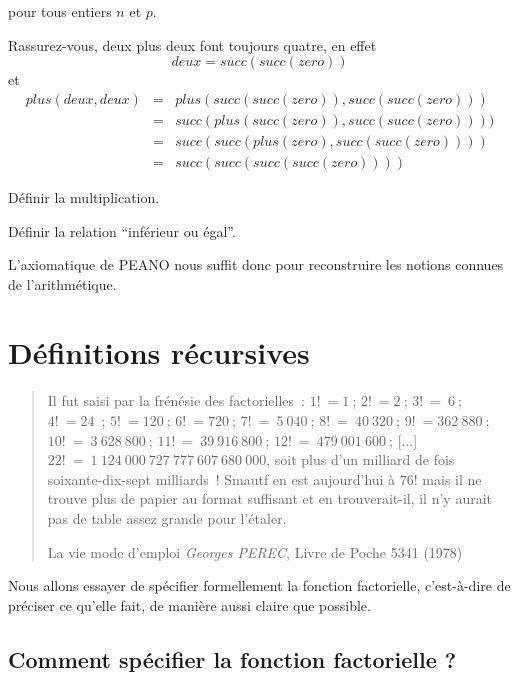 		pour tous entiers $n$ et $p$.

Rassurez-vous, deux plus deux font toujours quatre, en effet 
$$deux = succ(succ(zero))$$
et
$$\begin{array}{rcl}
	plus(deux, deux) 	&=& plus ( succ(succ(zero)),  succ(succ(zero)) ) \\
				&=& succ ( plus ( succ(zero)),  succ(succ(zero)) )) \\
				&=& succ (succ ( plus (zero),  succ(succ(zero)) )) \\
				&=& succ ( succ (succ ( succ ( zero ) ) ) )
\end{array}$$



\begin{exercice} Définir la multiplication.
\end{exercice}

\begin{exercice} Définir la relation ``inférieur ou égal''.
\end{exercice}

L'axiomatique de PEANO nous suffit donc pour reconstruire les notions
connues de l'arithmétique.


\section{Définitions récursives}

\begin{quotation}
Il fut saisi par la frénésie des factorielles~: $1!~= 1~$; $2!~= 2~$; 
$3!~=~6~$; $4!~= 24$~; $5!~= 120~$; $6!~= 720~$; $7!~=~5~040~$; $8!~=~40~320~$; 
$9!~=362~880~$; $10!~=~3~628~800~$; $11!~=~39~916~800~$; $12!~=~479~001~600~$; [...]
$22!~=~1~124~000~727~777~607~680~000$, soit plus d'un milliard de fois
soixante-dix-sept milliards~!  Smautf en est aujourd'hui à $76!$ mais il
ne trouve plus de papier au format suffisant et en trouverait-il, il
n'y aurait pas de table assez grande pour l'étaler.

La vie mode d'emploi {\em Georges PEREC}, Livre de Poche 5341 (1978)
\end{quotation}

Nous allons essayer de spécifier formellement la fonction factorielle,
c'est-à-dire de préciser ce qu'elle fait, de manière aussi claire que
possible.


\subsection*{Comment spécifier la fonction factorielle ?}

